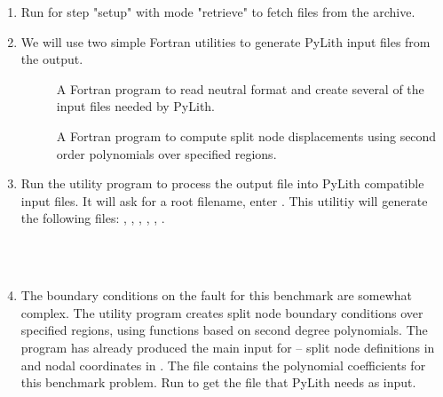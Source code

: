 \begin{enumerate}
\item Run  for step "setup" with mode "retrieve" to
  fetch files from the archive.

  \begin{screen}
    \shellprompt{}
  \end{screen}
  
\item We will use two simple Fortran utilities to generate PyLith
  input files from the  output.

  \begin{description}
  \item[] A Fortran program to read
     neutral format and create several of the
    input files needed by PyLith.
  \item[] A Fortran program to compute split node
    displacements using second order polynomials over specified
    regions.
  \end{description}
  
\item Run the  utility program to process the
   output file into PyLith compatible input files.
  It will ask for a root filename, enter . This
  utilitiy will generate the following files:
  , ,
  , ,
  , .

  \begin{screen}
    \shellprompt{}
    \\
    \\
  \end{screen}
  
\item The boundary conditions on the fault for this benchmark are
  somewhat complex. The utility program  creates
  split node boundary conditions over specified regions, using
  functions based on second degree polynomials. The
   program has already produced the main input for
   -- split node definitions in
   and nodal coordinates in
  . The file 
  contains the polynomial coefficients for this benchmark problem. Run
   to get the  file that
  PyLith needs as input.


\end{enumerate}
